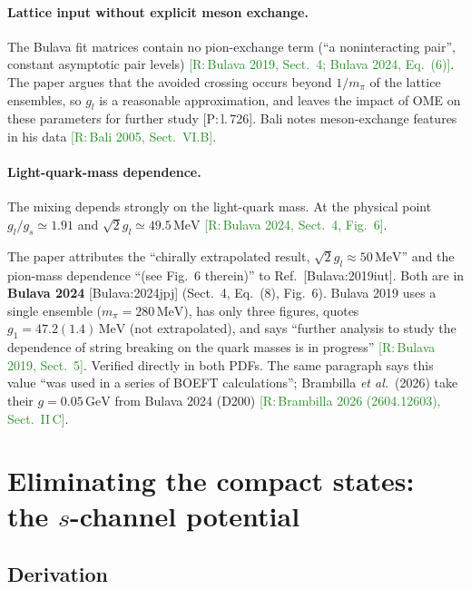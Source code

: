 \documentclass[11pt,a4paper]{article}
\newcommand{\tagP}[1]{\textcolor{blue!65!black}{\textsf{\small[P:\,#1]}}}
\newcommand{\tagR}[1]{\textcolor{ForestGreen}{\textsf{\small[R:\,#1]}}}
\renewcommand{\GeV}{\,\mathrm{GeV}}
\renewcommand{\MeV}{\,\mathrm{MeV}}
\begin{document}
\paragraph{Lattice input without explicit meson exchange.} The Bulava fit matrices contain no pion-exchange term (``a noninteracting pair'', constant asymptotic pair levels) \tagR{Bulava 2019, Sect.~4; Bulava 2024, Eq.~(6)}. The paper argues that the avoided crossing occurs beyond $1/m_\pi$ of the lattice ensembles, so $g_l$ is a reasonable approximation, and leaves the impact of OME on these parameters for further study \tagP{l.\,726}. Bali notes meson-exchange features in his data \tagR{Bali 2005, Sect.~VI.B}.

\paragraph{Light-quark-mass dependence.} The mixing depends strongly on the light-quark mass. At the physical point $g_l/g_s\simeq1.91$ and $\sqrt2g_l\simeq49.5\MeV$ \tagR{Bulava 2024, Sect.~4, Fig.~6}.

\begin{warnbox}
The paper attributes the ``chirally extrapolated result, $\sqrt2g_l\approx50\MeV$'' and the pion-mass dependence ``(see Fig.~6 therein)'' to Ref.~[Bulava:2019iut]. Both are in \textbf{Bulava 2024} [Bulava:2024jpj] (Sect.~4, Eq.~(8), Fig.~6). Bulava 2019 uses a single ensemble ($m_\pi=280\MeV$), has only three figures, quotes $g_1=47.2(1.4)\MeV$ (not extrapolated), and says ``further analysis to study the dependence of string breaking on the quark masses is in progress'' \tagR{Bulava 2019, Sect.~5}. Verified directly in both PDFs. The same paragraph says this value ``was used in a series of BOEFT calculations''; Brambilla \emph{et al.}\ (2026) take their $g=0.05\GeV$ from Bulava 2024 (D200) \tagR{Brambilla 2026 (2604.12603), Sect.~II\,C}.
\end{warnbox}

\section{Eliminating the compact states: the $s$-channel potential}
\label{sec:potential}

\subsection{Derivation}
\end{document}
